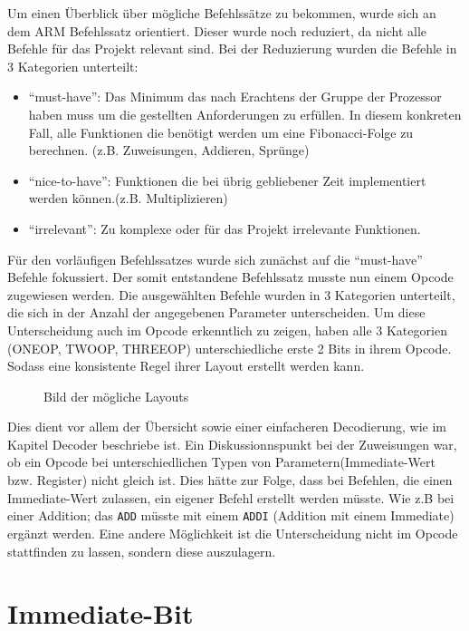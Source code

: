 \documentclass[paper=a4,fontsize=12pt,twocolumn]{scrreprt}
\begin{document}
Um einen Überblick über mögliche Befehlssätze zu bekommen, wurde sich an dem ARM Befehlssatz orientiert\footnotemark.
Dieser wurde noch reduziert, da nicht alle Befehle für das Projekt relevant sind.
Bei der Reduzierung wurden die Befehle in 3 Kategorien unterteilt:
\begin{itemize}
    \item \enquote{must-have}:
    Das Minimum das nach Erachtens der Gruppe der Prozessor haben muss um die gestellten Anforderungen zu erfüllen. In diesem konkreten Fall, alle Funktionen die benötigt werden um eine Fibonacci-Folge zu berechnen. (z.B. Zuweisungen, Addieren, Sprünge) 
    \item \enquote{nice-to-have}:
    Funktionen die bei übrig gebliebener Zeit implementiert werden können.(z.B. Multiplizieren)
    \item \enquote{irrelevant}:
    Zu komplexe oder für das Projekt irrelevante Funktionen.
\end{itemize}
Für den vorläufigen Befehlssatzes wurde sich zunächst auf die \enquote{must-have} Befehle fokussiert.
Der somit entstandene Befehlssatz musste nun einem Opcode zugewiesen werden.
Die ausgewählten Befehle wurden in 3 Kategorien unterteilt, die sich in der Anzahl der angegebenen Parameter unterscheiden.
Um diese Unterscheidung auch im Opcode erkenntlich zu zeigen, haben alle 3 Kategorien (ONEOP, TWOOP, THREEOP) unterschiedliche erste 2 Bits in ihrem Opcode.
Sodass eine konsistente Regel ihrer Layout erstellt werden kann.

\begin{figure}[h]
\centering
\caption{Bild der mögliche Layouts}
\end{figure}

Dies dient vor allem der Übersicht sowie einer einfacheren Decodierung, wie im Kapitel Decoder beschriebe ist. 
Ein Diskussionnspunkt bei der Zuweisungen war, ob ein Opcode bei unterschiedlichen Typen von Parametern(Immediate-Wert bzw. Register) nicht gleich ist.
Dies hätte zur Folge, dass bei Befehlen, die einen Immediate-Wert zulassen, ein eigener Befehl erstellt werden müsste.
Wie z.B bei einer Addition; das \texttt{ADD} müsste mit einem \texttt{ADDI} (Addition mit einem Immediate)  ergänzt werden.
Eine andere Möglichkeit ist die Unterscheidung nicht im Opcode stattfinden zu lassen, sondern diese auszulagern.

\section{Immediate-Bit}
\end{document}
